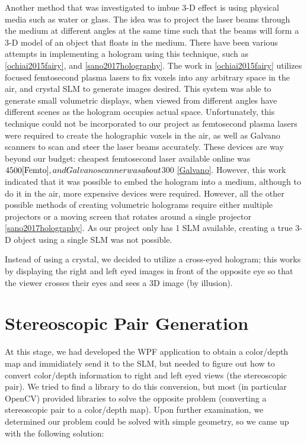 \documentclass[12pt]{article}
\begin{document}
Another method that was investigated to imbue 3-D effect is using physical media such as water or glass. The idea was to project the laser beams through the medium at different angles at the same time such that the beams will form a 3-D model of an object that floats in the medium. There have been various attempts in implementing a hologram using this technique, such as \ref{ochiai2015fairy}, and \ref{sano2017holography}. The work in \ref{ochiai2015fairy} utilizes focused femtosecond plasma lasers to fix voxels into any arbitrary space in the air, and crystal SLM to generate images desired. This system was able to generate small volumetric displays, when viewed from different angles have different scenes as the hologram occupies actual space. Unfortunately, this technique could not be incorporated to our project as femtosecond plasma lasers were required to create the holographic voxels in the air, as well as Galvano scanners to scan and steer the laser beams accurately. These devices are way beyond our budget: cheapest femtosecond laser available online was $4500 \ref{Femto}, and Galvano scanner was about $300 \ref{Galvano}. However, this work indicated that it was possible to embed the hologram into a medium, although to do it in the air, more expensive devices were required. However, all the other possible methods of creating volumetric holograms require either multiple projectors or a moving screen that rotates around a single projector \ref{sano2017holography}. As our project only has 1 SLM available, creating a true 3-D object using a single SLM was not possible.

Instead of using a crystal, we decided to utilize a cross-eyed hologram; this works by displaying the right and left eyed images in front of the opposite eye so that the viewer crosses their eyes and sees a 3D image (by illusion).

\section{Stereoscopic Pair Generation}

At this stage, we had developed the WPF application to obtain a color/depth map and immidiately send it to the SLM, but needed to figure out how to convert color/depth information to right and left eyed views (the stereoscopic pair). We tried to find a library to do this conversion, but most (in particular OpenCV) provided libraries to solve the opposite problem (converting a stereoscopic pair to a color/depth map). Upon further examination, we determined our problem could be solved with simple geometry, so we came up with the following solution:
\end{document}
